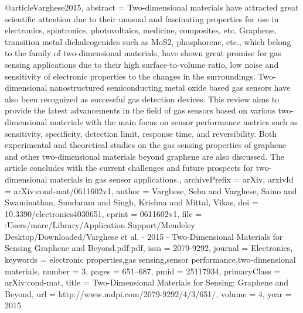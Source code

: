 @article{Varghese2015,
abstract = {Two-dimensional materials have attracted great scientific attention due to their unusual and fascinating properties for use in electronics, spintronics, photovoltaics, medicine, composites, etc. Graphene, transition metal dichalcogenides such as MoS2, phosphorene, etc., which belong to the family of two-dimensional materials, have shown great promise for gas sensing applications due to their high surface-to-volume ratio, low noise and sensitivity of electronic properties to the changes in the surroundings. Two-dimensional nanostructured semiconducting metal oxide based gas sensors have also been recognized as successful gas detection devices. This review aims to provide the latest advancements in the field of gas sensors based on various two-dimensional materials with the main focus on sensor performance metrics such as sensitivity, specificity, detection limit, response time, and reversibility. Both experimental and theoretical studies on the gas sensing properties of graphene and other two-dimensional materials beyond graphene are also discussed. The article concludes with the current challenges and future prospects for two-dimensional materials in gas sensor applications.},
archivePrefix = {arXiv},
arxivId = {arXiv:cond-mat/0611602v1},
author = {Varghese, Seba and Varghese, Saino and Swaminathan, Sundaram and Singh, Krishna and Mittal, Vikas},
doi = {10.3390/electronics4030651},
eprint = {0611602v1},
file = {:Users/marc/Library/Application Support/Mendeley Desktop/Downloaded/Varghese et al. - 2015 - Two-Dimensional Materials for Sensing Graphene and Beyond.pdf:pdf},
issn = {2079-9292},
journal = {Electronics},
keywords = {electronic properties,gas sensing,sensor performance,two-dimensional materials},
number = {3},
pages = {651--687},
pmid = {25117934},
primaryClass = {arXiv:cond-mat},
title = {{Two-Dimensional Materials for Sensing: Graphene and Beyond}},
url = {http://www.mdpi.com/2079-9292/4/3/651/},
volume = {4},
year = {2015}
}
